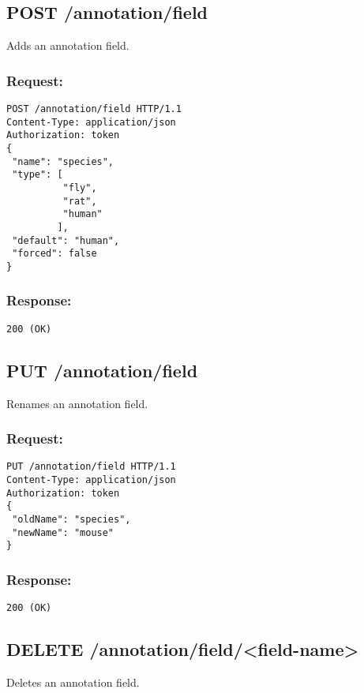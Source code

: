 \subsection*{POST /annotation/field}

Adds an annotation field.

\subsubsection*{Request:}
\begin{verbatim}
POST /annotation/field HTTP/1.1
Content-Type: application/json
Authorization: token
{ 
 "name": "species",
 "type": [
          "fly",
          "rat",  
          "human" 
         ],
 "default": "human", 
 "forced": false
}
\end{verbatim}

\subsubsection*{Response:}
\begin{verbatim}
200 (OK)
\end{verbatim}

\subsection*{PUT /annotation/field}

Renames an annotation field.

\subsubsection{Request:}
\begin{verbatim}
PUT /annotation/field HTTP/1.1
Content-Type: application/json
Authorization: token
{
 "oldName": "species",
 "newName": "mouse"
}
\end{verbatim}

\subsubsection*{Response:}
\begin{verbatim}
200 (OK)
\end{verbatim}

\subsection*{DELETE /annotation/field/<field-name>}

Deletes an annotation field.

